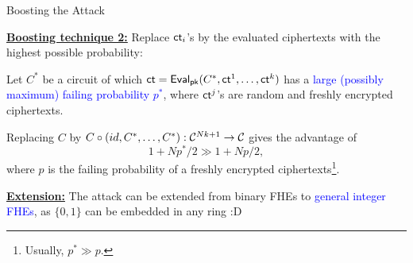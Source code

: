 \documentclass[handout]{beamer}
\begin{document}
	\begin{frame}{Boosting the \indcpad Attack}
 
    {\small
    \underline{\bf Boosting technique 2:} Replace ${\sf ct}_i$'s by the evaluated ciphertexts with the highest possible probability: \pause\vspace{0.3cm}
    
    Let $C^*$ be a circuit of which ${\sf ct} = {\sf Eval}_{\sf pk}(C^*, {\sf ct}^1, \dots, {\sf ct}^k)$ has a \textcolor{blue}{large (possibly maximum) failing probability $p^*$}, where ${\sf ct}^j$'s are random and freshly encrypted ciphertexts. \pause\vspace{0.3cm}
    
    Replacing $C$ by $C \circ (id, C^*, \dots, C^*): {\mathcal C}^{Nk+1} \rightarrow {\mathcal C}$ gives the advantage of $$1 + Np^*/2 \gg 1 + Np/2,$$ where $p$ is the failing probability of a freshly encrypted ciphertexts\footnote{Usually, $p^* \gg p$.}. \pause\vspace{0.2cm}

    \underline{\bf Extension:} The attack can be extended from binary FHEs to \textcolor{blue}{general integer FHEs}, as $\{0, 1\}$ can be embedded in any ring :D
    }
	\end{frame}
\end{document}
